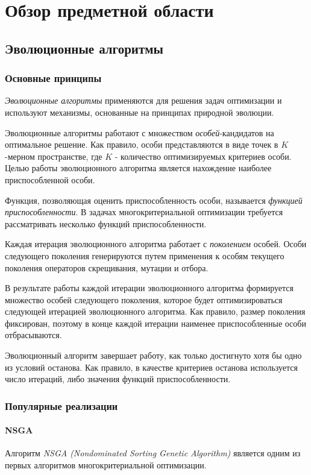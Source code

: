 \chapter{Обзор предметной области}
\label{chapter1}

\section{Эволюционные алгоритмы}
\label{evo_algs}

\subsection{Основные принципы}
\textit{Эволюционные алгоритмы} применяются для решения задач оптимизации и используют механизмы, 
основанные на принципах природной эволюции.\cite{petrova_evo1} 

Эволюционные алгоритмы работают с множеством \textit{особей}-кандидатов на оптимальное решение. 
Как правило, особи представляются в виде точек в $K$-мерном пространстве, где $K$ - количество 
оптимизируемых критериев особи. Целью работы эволюционного алгоритма является нахождение наиболее 
приспособленной особи.

Функция, позволяющая оценить приспособленность особи, называется \textit{функцией приспособленности}.
В задачах многокритериальной оптимизации требуется рассматривать несколько функций приспособленности.

Каждая итерация эволюционного алгоритма работает с \textit{поколением} особей. Особи следующего 
поколения генерируются путем применения к особям текущего поколения операторов скрещивания, 
мутации и отбора.

В результате работы каждой итерации эволюционного алгоритма формируется множество особей следующего 
поколения, которое будет оптимизироваться следующей итерацией эволюционного алгоритма. Как правило, 
размер поколения фиксирован, поэтому в конце каждой итерации наименее приспособленные особи 
отбрасываются.

Эволюционный алгоритм завершает работу, как только достигнуто хотя бы одно из условий останова.
Как правило, в качестве критериев останова используется число итераций, либо значения функций
приспособленности.

\subsection{Популярные реализации}
\subsubsection{NSGA}
Алгоритм \textit{NSGA (Nondominated Sorting Genetic Algorithm)} является одним из первых алгоритмов
многокритериальной оптимизации. \cite{deb_nsga2}

